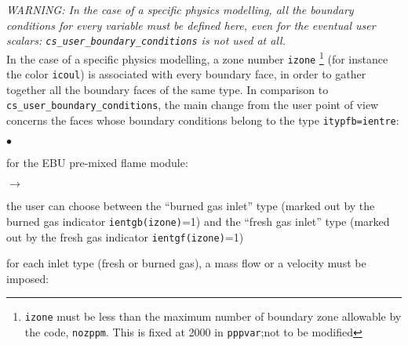 {{{\em WARNING: In the case of a specific physics modelling, all the
boundary conditions for every variable must be defined here, even for
the eventual user scalars: {\em \texttt{cs\_user\_boundary\_conditions}} is not used at all.}\\

In the case of a specific physics modelling, a zone number \texttt{izone}
\footnote{\texttt{izone} must be less than the maximum number of boundary
zone allowable by the code, \texttt{nozppm}. This is fixed at 2000 in
 \texttt{pppvar};not to be modified} (for
instance the color \texttt{icoul}) is associated with every boundary face, in
order to gather together all the boundary faces of the same type. In
comparison to \texttt{cs\_user\_boundary\_conditions}, the main change from the user point of
view concerns the faces whose boundary conditions belong to the type
\texttt{itypfb=ientre}:

\begin{list}{$\bullet$}{}
       \item for the EBU pre-mixed flame module:
             \begin{list}{$\rightarrow$}{}
                    \item the user can choose between the ``burned gas
                          inlet'' type (marked out by the burned gas indicator
                          \texttt{ientgb(izone)}=1) and the
                          ``fresh gas inlet'' type (marked out by
                          the fresh gas indicator
                          \texttt{ientgf(izone)}=1)
                    \item for each inlet type (fresh or burned
                          gas), a mass flow or a velocity must be imposed:


\end{list}
\end{list}}}
